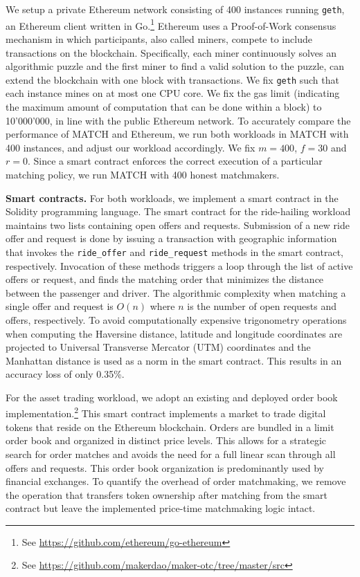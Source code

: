 We setup a private Ethereum network consisting of 400 instances running \texttt{geth}, an Ethereum client written in Go.\footnote{See \url{https://github.com/ethereum/go-ethereum}}
Ethereum uses a Proof-of-Work consensus mechanism in which participants, also called miners, compete to include transactions on the blockchain.
Specifically, each miner continuously solves an algorithmic puzzle and the first miner to find a valid solution to the puzzle, can extend the blockchain with one block with transactions.
We fix \texttt{geth} such that each instance mines on at most one CPU core.
We fix the gas limit (indicating the maximum amount of computation that can be done within a block) to 10'000'000, in line with the public Ethereum network.
To accurately compare the performance of MATCH and Ethereum, we run both workloads in MATCH with 400 instances, and adjust our workload accordingly.
We fix $ m = 400 $, $ f = 30 $ and $ r = 0 $.
Since a smart contract enforces the correct execution of a particular matching policy, we run MATCH with 400 honest matchmakers.

\textbf{Smart contracts.}
For both workloads, we implement a smart contract in the Solidity programming language.
The smart contract for the ride-hailing workload maintains two lists containing open offers and requests.
Submission of a new ride offer and request is done by issuing a transaction with geographic information that invokes the \texttt{ride\_offer} and \texttt{ride\_request} methods in the smart contract, respectively.
Invocation of these methods triggers a loop through the list of active offers or request, and finds the matching order that minimizes the distance between the passenger and driver.
The algorithmic complexity when matching a single offer and request is $ O(n) $ where $ n $ is the number of open requests and offers, respectively.
To avoid computationally expensive trigonometry operations when computing the Haversine distance, latitude and longitude coordinates are projected to Universal Transverse Mercator (UTM) coordinates and the Manhattan distance is used as a norm in the smart contract.
This results in an accuracy loss of only 0.35\%.

For the asset trading workload, we adopt an existing and deployed order book implementation.\footnote{See \url{https://github.com/makerdao/maker-otc/tree/master/src}}
This smart contract implements a market to trade digital tokens that reside on the Ethereum blockchain.
Orders are bundled in a limit order book and organized in distinct price levels.
This allows for a strategic search for order matches and avoids the need for a full linear scan through all offers and requests.
This order book organization is predominantly used by financial exchanges.
To quantify the overhead of order matchmaking, we remove the operation that transfers token ownership after matching from the smart contract but leave the implemented price-time matchmaking logic intact.

